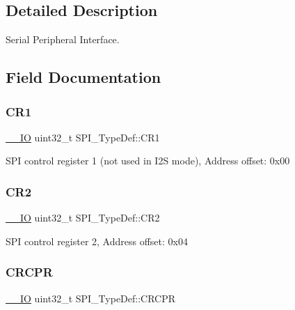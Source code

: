 \subsection{Detailed Description}
Serial Peripheral Interface. 

\subsection{Field Documentation}
\mbox{\label{struct_s_p_i___type_def_a6ecd5cb63b85c381bd67dc90dd4f573a}} 
\subsubsection{\texorpdfstring{C\+R1}{CR1}}
{\footnotesize\ttfamily \hyperlink{core__sc300_8h_aec43007d9998a0a0e01faede4133d6be}{\+\_\+\+\_\+\+IO} uint32\+\_\+t S\+P\+I\+\_\+\+Type\+Def\+::\+C\+R1}

S\+PI control register 1 (not used in I2S mode), Address offset\+: 0x00 \mbox{\label{struct_s_p_i___type_def_a38cb89a872e456e6ecd29b6c71d85600}} 
\subsubsection{\texorpdfstring{C\+R2}{CR2}}
{\footnotesize\ttfamily \hyperlink{core__sc300_8h_aec43007d9998a0a0e01faede4133d6be}{\+\_\+\+\_\+\+IO} uint32\+\_\+t S\+P\+I\+\_\+\+Type\+Def\+::\+C\+R2}

S\+PI control register 2, Address offset\+: 0x04 \mbox{\label{struct_s_p_i___type_def_a609d2a279b1927846a991deb9d0dc0b0}} 
\subsubsection{\texorpdfstring{C\+R\+C\+PR}{CRCPR}}
{\footnotesize\ttfamily \hyperlink{core__sc300_8h_aec43007d9998a0a0e01faede4133d6be}{\+\_\+\+\_\+\+IO} uint32\+\_\+t S\+P\+I\+\_\+\+Type\+Def\+::\+C\+R\+C\+PR}

